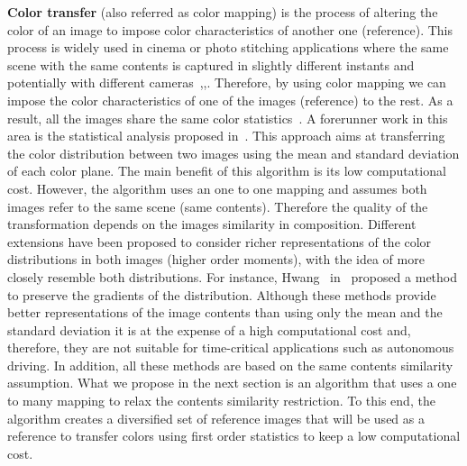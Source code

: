 \textbf{Color transfer} (also referred as color mapping) is the
process of altering the color of an image to impose color
characteristics of another one (reference). This process is widely
used in cinema or photo stitching applications where the same
scene with the same contents is captured in slightly different
instants and potentially with different
cameras~\cite{CT_ECCV:2012},\cite{CT_CVPR:2011},\cite{CT_CVPR:2014}.
Therefore, by using color mapping we can impose the color
characteristics of one of the images (reference) to the rest. As a
result, all the images share the same color
statistics~\cite{faridul:2014}. A forerunner work in this area is
the statistical analysis proposed in~\cite{Reinhard:2001}. This
approach aims at transferring the color distribution between two
images using the mean and standard deviation of each color plane.
The main benefit of this algorithm is its low computational cost.
However, the algorithm uses an one to one mapping and assumes both
images refer to the same scene (same contents). Therefore the
quality of the transformation depends on the images similarity in
composition. Different extensions have been proposed to consider
richer representations of the color distributions in both
images (higher order moments), with the idea of more closely
resemble both distributions. For instance, Hwang~\etal
in~\cite{CT_CVPR:2014} proposed a method to preserve the gradients
of the distribution. Although these methods provide better
representations of the image contents than using only the mean and
the standard deviation it is at the expense of a high
computational cost and, therefore, they are not suitable for
time-critical applications such as autonomous driving. In
addition, all these methods are based on the same contents
similarity assumption. What we propose in the next section is an
algorithm that uses a one to many mapping to relax the contents
similarity restriction. To this end, the algorithm creates a
diversified set of reference images that will be used as a
reference to transfer colors using first order statistics to keep
a low computational cost.



%
%
%
